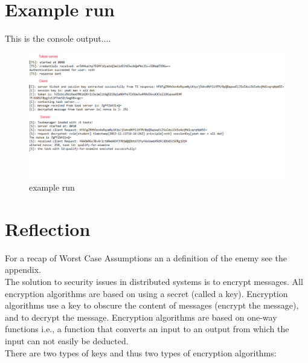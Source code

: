 \section{Example run}

This is the console output....

\begin{figure}
\centering
\caption{example run}
\includegraphics[scale=0.5]{images/security_run.png}
\end{figure}
\vspace{10pt}

\section{Reflection}

For a recap of Worst Case Assumptions an a definition of the enemy see the appendix.\\

The solution to security issues in distributed systems is to encrypt messages. All encryption algorithms are based on using a secret (called a key). Encryption algorithms use a key to obscure the content of messages (encrypt the message), and to decrypt the message. Encryption algorithms are based on one-way functions i.e., a function that converts an input to an output from which the input can not easily be deducted. \\ 

There are two types of keys and thus two types of encryption algorithms: \\

